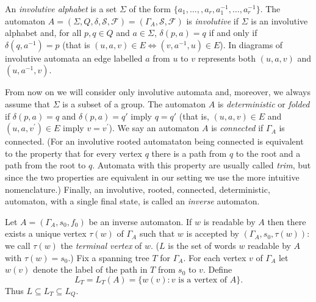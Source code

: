 \documentclass[a4paper,12pt]{article}
\renewcommand{\a}{\alpha }
\renewcommand{\b}{\beta }
\newcommand{\G}{\Gamma }
\renewcommand{\d}{\delta }
\renewcommand{\S}{\Sigma }
\renewcommand{\t}{\tau }
\numberwithin{equation}{section}
\numberwithin{figure}{section}
\begin{document}


An {\em involutive alphabet} is a set $\S$ of the form $\{a_1, \ldots, ,
a_r, a_1^{-1}, \ldots, a_r^{-1}\}$.
The automaton $A =(\S, Q, \d,\mathcal{S},\mathcal{F})
= (\G_A, \mathcal{S}, \mathcal{F})$ is {\em
involutive} if $\S$ is an
involutive alphabet and, for all $p, q \in Q$ and $a \in \S$,
$\d(p,a)=q$ if and only if $\d(q, a^{-1})=p$ (that is $(u, a, v) \in E
\Leftrightarrow (v, a^{-1}, u) \in E$).
In diagrams of involutive automata an edge labelled $a$  from
$u$ to $v$  represents
both $(u,a,v)$ and $(u,a^{-1},v)$.  

From now on we will
consider only involutive automata and, moreover, we always assume that $\S$ is a subset of a group.
The automaton $A$
is {\em deterministic}  or {\em folded} if $\d(p,a)=q$ and
$\d(p,a)=q'$ imply $q=q'$ (that is, $(u, a, v)
\in E$ and $(u, a, v^\prime) \in E$ imply $v=v^\prime$).
We say an automaton $A$ is \emph{connected} if $\G_A$ is connected.
(For an involutive rooted automataton being connected is equivalent to the property that 
for every vertex $q$ there is a path from $q$ to the root and a path from the root to $q$. 
Automata with this property are usually called \emph{trim}, but since the two properties are 
equivalent in our setting we use the more intuitive nomenclature.)
Finally, an involutive, rooted, connected, deterministic,
automaton, with a single final state, is called an {\em inverse}
automaton.

Let $A=(\G_A,s_0,f_0)$ be an inverse automaton.
If $w$ is readable by $A$ then there exists a
unique vertex  $\t(w)$ of $\G_A$ such that $w$ is accepted by
$(\G_A,s_0,\t(w))$: we call $\t(w)$ the {\em terminal vertex} of $w$. ($L$ is the set of words $w$ readable by $A$ with
$\t(w)=s_0$.)
Fix a spanning tree $T$ for $\G_A$. For each vertex $v$ of $\G_A$
let $w(v)$ denote the label of the path in
$T$ from $s_0$ to $v$.  Define
\[L_T=L_T(A)=\{w(v): v \textrm{ is a vertex of } A\}.\]
Thus $L\subseteq L_T\subseteq L_Q$. 
\end{document}
